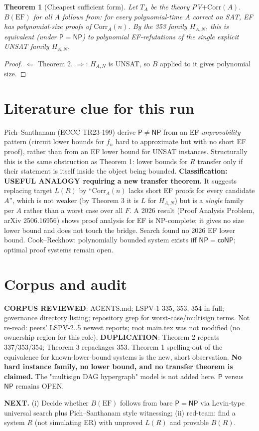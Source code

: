 \documentclass[11pt]{article}
\newtheorem{theorem}{Theorem}
\theoremstyle{definition}\newtheorem{remark}{Remark}
\begin{document}
\begin{theorem}[Cheapest sufficient form]
Let $T_A$ be the theory PV$+\mathrm{Corr}(A)$. $B(\mathrm{EF})$ for all $A$ follows from: for every polynomial-time $A$ correct on SAT, EF has polynomial-size proofs of $\mathrm{Corr}_A(n)$. By the 353 family $H_{A,N}$, this is equivalent (under $\mathsf P=\mathsf{NP}$) to polynomial EF-refutations of the \emph{single} explicit UNSAT family $H_{A,N}$.
\end{theorem}
\begin{proof} $\Leftarrow$ Theorem 2. $\Rightarrow$: $H_{A,N}$ is UNSAT, so $B$ applied to it gives polynomial size. \end{proof}

\section{Literature clue for this run}
Pich--Santhanam (ECCC TR23-199) derive $\mathsf P\ne\mathsf{NP}$ from an EF \emph{unprovability} pattern (circuit lower bounds for $f_n$ hard to approximate but with no short EF proof), rather than from an EF lower bound for UNSAT instances. Structurally this is the same obstruction as Theorem 1: lower bounds for $R$ transfer only if their statement is itself inside the object being bounded. \textbf{Classification: USEFUL ANALOGY requiring a new transfer theorem.} It suggests replacing target $L(R)$ by ``$\mathrm{Corr}_A(n)$ lacks short EF proofs for every candidate $A$'', which is not weaker (by Theorem 3 it is $L$ for $H_{A,N}$) but is a \emph{single} family per $A$ rather than a worst case over all $F$. A 2026 result (Proof Analysis Problem, arXiv 2506.16956) shows proof analysis for EF is NP-complete; it gives no size lower bound and does not touch the bridge. Search found no 2026 EF lower bound. Cook--Reckhow: polynomially bounded system exists iff $\mathsf{NP}=\mathsf{coNP}$; optimal proof systems remain open.

\section{Corpus and audit}
\textbf{CORPUS REVIEWED}: AGENTS.md; LSPV-1 335, 353, 354 in full; governance directory listing; repository grep for worst-case/multisign terms. Not re-read: peers' LSPV-2..5 newest reports; root main.tex was not modified (no ownership region for this role). \textbf{DUPLICATION}: Theorem 2 repeats 337/353/354; Theorem 3 repackages 353. Theorem 1 spelling-out of the equivalence for known-lower-bound systems is the new, short observation. \textbf{No hard instance family, no lower bound, and no transfer theorem is claimed.} The "multisign DAG hypergraph" model is not added here. $\mathsf P$ versus $\mathsf{NP}$ remains OPEN.

\textbf{NEXT.} (i) Decide whether $B(\mathrm{EF})$ follows from bare $\mathsf P=\mathsf{NP}$ via Levin-type universal search plus Pich--Santhanam style witnessing; (ii) red-team: find a system $R$ (not simulating ER) with unproved $L(R)$ and provable $B(R)$.
\end{document}
